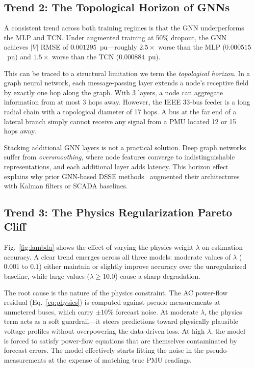 \documentclass[conference]{IEEEtran}
\begin{document}
\subsection{Trend 2: The Topological Horizon of GNNs}

A consistent trend across both training regimes is that the GNN underperforms the MLP and TCN. Under augmented training at 50\% dropout, the GNN achieves $|V|$ RMSE of $0.001295$~pu---roughly $2.5\times$ worse than the MLP ($0.000515$~pu) and $1.5\times$ worse than the TCN ($0.000884$~pu).

This can be traced to a structural limitation we term the \textit{topological horizon}. In a graph neural network, each message-passing layer extends a node's receptive field by exactly one hop along the graph. With 3 layers, a node can aggregate information from at most 3 hops away. However, the IEEE 33-bus feeder is a long radial chain with a topological diameter of 17 hops. A bus at the far end of a lateral branch simply cannot receive any signal from a PMU located 12 or 15 hops away.

Stacking additional GNN layers is not a practical solution. Deep graph networks suffer from \textit{oversmoothing}, where node features converge to indistinguishable representations, and each additional layer adds latency. This horizon effect explains why prior GNN-based DSSE methods~\cite{ngo2024, hu2025} augmented their architectures with Kalman filters or SCADA baselines.

\subsection{Trend 3: The Physics Regularization Pareto Cliff}

Fig.~\ref{fig:lambda} shows the effect of varying the physics weight $\lambda$ on estimation accuracy. A clear trend emerges across all three models: moderate values of $\lambda$ ($0.001$ to $0.1$) either maintain or slightly improve accuracy over the unregularized baseline, while large values ($\lambda \ge 10.0$) cause a sharp degradation.

The root cause is the nature of the physics constraint. The AC power-flow residual (Eq.~\ref{eq:physics}) is computed against pseudo-measurements at unmetered buses, which carry ${\pm}10\%$ forecast noise. At moderate $\lambda$, the physics term acts as a soft guardrail---it steers predictions toward physically plausible voltage profiles without overpowering the data-driven loss. At high $\lambda$, the model is forced to satisfy power-flow equations that are themselves contaminated by forecast errors. The model effectively starts fitting the noise in the pseudo-measurements at the expense of matching true PMU readings.
\end{document}

